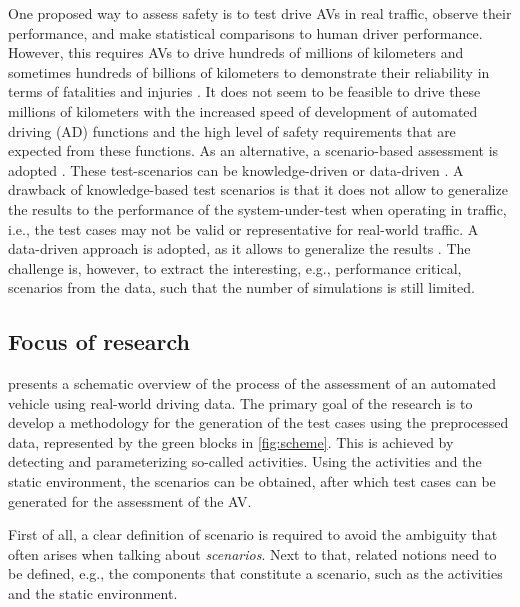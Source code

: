 One proposed way to assess safety is to test drive AVs in real traffic, observe their performance, and make statistical comparisons to human driver performance. However, this requires AVs to drive hundreds of millions of kilometers and sometimes hundreds of billions of kilometers to demonstrate their reliability in terms of fatalities and injuries \cite{kalra2016driving}. It does not seem to be feasible to drive these millions of kilometers with the increased speed of development of automated driving (AD) functions and the high level of safety requirements that are expected from these functions. As an alternative, a scenario-based assessment is adopted \cite{putz2017pegasus, stellet2015taxonomy, deGelder2017assessment, ploeg2018cetran, elrofai2018scenario}. 
These test-scenarios can be knowledge-driven or data-driven \cite{stellet2015taxonomy}. A drawback of knowledge-based test scenarios is that it does not allow to generalize the results to the performance of the system-under-test when operating in traffic, i.e., the test cases may not be valid or representative for real-world traffic. A data-driven approach is adopted, as it allows to generalize the results \cite{deGelder2017assessment}. The challenge is, however, to extract the interesting, e.g., performance critical, scenarios from the data, such that the number of simulations is still limited.

\subsection{Focus of research}
\label{sec:focus}

 presents a schematic overview of the process of the assessment of an automated vehicle using real-world driving data. The primary goal of the research is to develop a methodology for the generation of the test cases using the preprocessed data, represented by the green blocks in \cref{fig:scheme}. This is achieved by detecting and parameterizing so-called activities. Using the activities and the static environment, the scenarios can be obtained, after which test cases can be generated for the assessment of the AV.



First of all, a clear definition of scenario is required to avoid the ambiguity that often arises when talking about \emph{scenarios}. Next to that, related notions need to be defined, e.g., the components that constitute a scenario, such as the activities and the static environment. 

